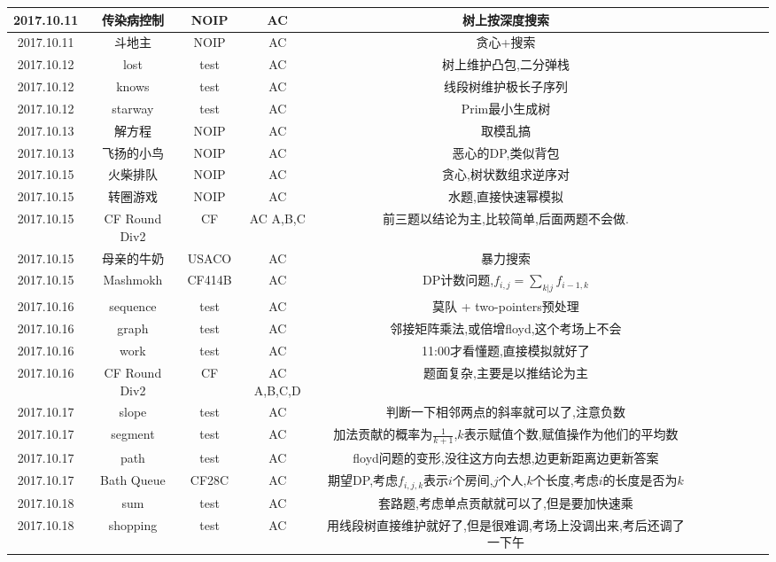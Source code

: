 \documentclass[landscape]{article}
\begin{document}
\begin{longtable}{ccccccccccc}
  \hline
  2017.10.11 & 传染病控制 & NOIP & AC & 树上按深度搜索\\
  \hline
  2017.10.11 & 斗地主 & NOIP & AC & 贪心+搜索\\
  \hline
  2017.10.12 & lost & test & AC & 树上维护凸包,二分弹栈\\
  \hline
  2017.10.12 & knows & test & AC & 线段树维护极长子序列\\
  \hline
  2017.10.12 & starway & test & AC & Prim最小生成树\\
  \hline
  2017.10.13 & 解方程 & NOIP & AC & 取模乱搞\\
  \hline
  2017.10.13 & 飞扬的小鸟 & NOIP & AC & 恶心的DP,类似背包\\
  \hline
  2017.10.15 & 火柴排队 & NOIP & AC & 贪心,树状数组求逆序对\\
  \hline
  2017.10.15 & 转圈游戏 & NOIP & AC & 水题,直接快速幂模拟\\
  \hline
  2017.10.15 & CF Round Div2 & CF  & AC A,B,C & 前三题以结论为主,比较简单,后面两题不会做.\\
  \hline
  2017.10.15 & 母亲的牛奶 & USACO & AC & 暴力搜索\\
  \hline
  2017.10.15 & Mashmokh & CF414B & AC & DP计数问题,$f_{i,j} = \sum_{k|j}{f_{i-1,k}}$\\
  \hline
  2017.10.16 & sequence & test & AC & 莫队 + two-pointers预处理\\
  \hline
  2017.10.16 & graph & test & AC & 邻接矩阵乘法,或倍增floyd,这个考场上不会\\
  \hline
  2017.10.16 & work & test & AC & 11:00才看懂题,直接模拟就好了\\
  \hline
  2017.10.16 & CF Round Div2 & CF & AC A,B,C,D & 题面复杂,主要是以推结论为主\\
  \hline
  2017.10.17 & slope & test & AC & 判断一下相邻两点的斜率就可以了,注意负数\\
  \hline
  2017.10.17 & segment & test & AC & 加法贡献的概率为$\frac{1}{k+1}$,$k$表示赋值个数,赋值操作为他们的平均数\\
  \hline
  2017.10.17 & path & test & AC & floyd问题的变形,没往这方向去想,边更新距离边更新答案\\
  \hline
  2017.10.17 & Bath Queue & CF28C & AC & 期望DP,考虑$f_{i,j,k}$表示$i$个房间,$j$个人,$k$个长度,考虑$i$的长度是否为$k$\\
  \hline
  2017.10.18 & sum & test & AC & 套路题,考虑单点贡献就可以了,但是要加快速乘\\
  \hline
  2017.10.18 & shopping & test & AC & 用线段树直接维护就好了,但是很难调,考场上没调出来,考后还调了一下午\\

\end{longtable}
\end{document}
